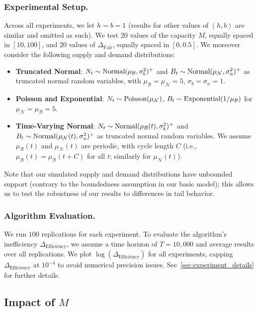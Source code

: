 \documentclass[mnsc,nonblindrev]{informs3}
\newcommand{\NDist}{\mathcal{N}}
\newcommand{\BDist}{\mathcal{B}}
\newcommand{\Nmean}{\mu_{\NDist}}
\newcommand{\Bmean}{\mu_{\BDist}}
\newcommand{\Deff}{\Delta_{\text{Efficiency}}\xspace}
\newcommand{\Dfair}{\Delta_{\text{Fair}}\xspace}
\newcommand{\Norm}{\textup{Normal}}
\newcommand{\Exponential}{\textup{Exponential}}
\newcommand{\Poisson}{\textup{Poisson}}
\renewcommand{\paragraph}[1]{\subsubsection*{#1}}
\begin{document}
\paragraph{Experimental Setup.}  Across all experiments, we let $h = b = 1$ (results for other values of $(h,b)$ are similar and omitted as such).  {We test 20 values of the capacity $M$, equally spaced in $[10, 100]$, and 20 values of $\Dfair$, equally spaced in $[0, 0.5]$}.  We moreover consider the following supply and demand distributions:
\begin{itemize}
    \item {\bf Truncated Normal}: $N_t \sim \Norm(\Bmean, \sigma_b^2)^+$ and $B_t \sim \Norm(\Nmean, \sigma_n^2)^+$ as truncated normal random variables, with $\Bmean = \Nmean = 5$, $\sigma_b = \sigma_n = 1$.
    \item {\bf Poisson and Exponential}: $N_t \sim \Poisson(\Nmean)$, $B_t \sim \Exponential(1 / \Bmean)$ for $\Nmean = \Bmean = 5$.
    \item {\bf Time-Varying Normal}: $N_t \sim \Norm(\Bmean(t), \sigma_b^2)^+$ and $B_t \sim \Norm(\Nmean(t), \sigma_n^2)^+$ as truncated normal random variables.  {We assume $\Bmean(t)$ and $\Nmean(t)$ are periodic, with cycle length $C$ (i.e., $\Bmean(t) = \Bmean(t+C)$ for all $t$; similarly for $\Nmean(t)$).}
\end{itemize}
Note that our simulated supply and demand distributions have unbounded support (contrary to the boundedness assumption in our basic model); this allows us to test the robustness of our results to differences in tail behavior.

\paragraph{Algorithm Evaluation.} We run $100$ replications for each experiment.  To evaluate the algorithm's inefficiency $\Deff$, we assume a time horizon of $T = 10,000$ and average results over all replications. We plot $\log(\Deff)$ for all experiments, capping $\Deff$ at $10^{-4}$ to avoid numerical precision issues. 
See~\cref{sec:experiment_details} for further details. 

\subsection{Impact of $M$}
\label{sec:experiment_m_scale}
\end{document}
